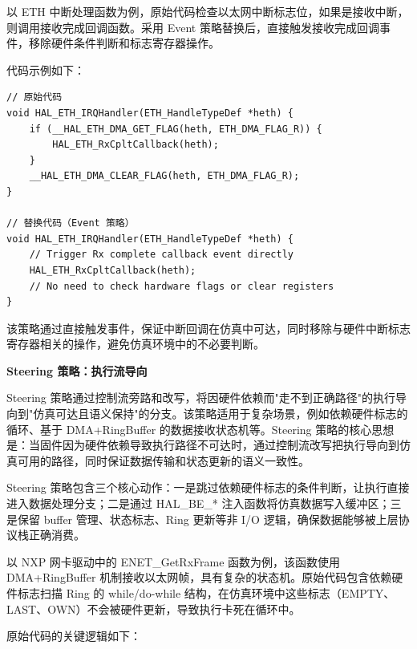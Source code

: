 以 ETH 中断处理函数为例，原始代码检查以太网中断标志位，如果是接收中断，则调用接收完成回调函数。采用 Event 策略替换后，直接触发接收完成回调事件，移除硬件条件判断和标志寄存器操作。

代码示例如下：

\begin{lstlisting}[style=CStyle,abovecaptionskip=0pt,belowcaptionskip=0pt]
// 原始代码
void HAL_ETH_IRQHandler(ETH_HandleTypeDef *heth) {
    if (__HAL_ETH_DMA_GET_FLAG(heth, ETH_DMA_FLAG_R)) {
        HAL_ETH_RxCpltCallback(heth);
    }
    __HAL_ETH_DMA_CLEAR_FLAG(heth, ETH_DMA_FLAG_R);
}

// 替换代码（Event 策略）
void HAL_ETH_IRQHandler(ETH_HandleTypeDef *heth) {
    // Trigger Rx complete callback event directly
    HAL_ETH_RxCpltCallback(heth);
    // No need to check hardware flags or clear registers
}
\end{lstlisting}

该策略通过直接触发事件，保证中断回调在仿真中可达，同时移除与硬件中断标志寄存器相关的操作，避免仿真环境中的不必要判断。

\textbf{Steering 策略：执行流导向}

Steering 策略通过控制流旁路和改写，将因硬件依赖而"走不到正确路径"的执行导向到"仿真可达且语义保持"的分支。该策略适用于复杂场景，例如依赖硬件标志的循环、基于 DMA+RingBuffer 的数据接收状态机等。Steering 策略的核心思想是：当固件因为硬件依赖导致执行路径不可达时，通过控制流改写把执行导向到仿真可用的路径，同时保证数据传输和状态更新的语义一致性。

Steering 策略包含三个核心动作：一是跳过依赖硬件标志的条件判断，让执行直接进入数据处理分支；二是通过 HAL\_BE\_* 注入函数将仿真数据写入缓冲区；三是保留 buffer 管理、状态标志、Ring 更新等非 I/O 逻辑，确保数据能够被上层协议栈正确消费。

以 NXP 网卡驱动中的 ENET\_GetRxFrame 函数为例，该函数使用 DMA+RingBuffer 机制接收以太网帧，具有复杂的状态机。原始代码包含依赖硬件标志扫描 Ring 的 while/do-while 结构，在仿真环境中这些标志（EMPTY、LAST、OWN）不会被硬件更新，导致执行卡死在循环中。

原始代码的关键逻辑如下：

